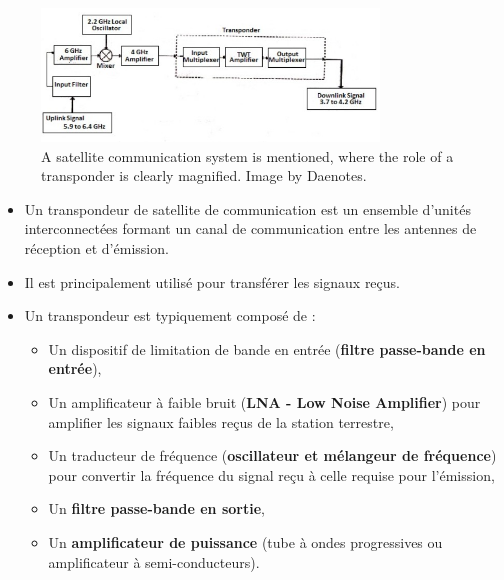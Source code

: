 \begin{figure}[H]
    \centering
    \includegraphics[width=0.8\textwidth]{figures/6-80.jpg}
    \caption{A satellite communication system is mentioned, where the role of a transponder is clearly magnified. Image by Daenotes.}
    \label{fig:communication7}
\end{figure}

\begin{itemize}
    \item Un transpondeur de satellite de communication est un ensemble d'unit\'es interconnect\'ees formant un canal de communication entre les antennes de r\'eception et d’\'emission.
    \item Il est principalement utilis\'e pour transf\'erer les signaux re\c{c}us.
    \item Un transpondeur est typiquement compos\'e de :
    \begin{itemize}
        \item Un dispositif de limitation de bande en entr\'ee (\textbf{filtre passe-bande en entr\'ee}),
        \item Un amplificateur \`a faible bruit (\textbf{LNA - Low Noise Amplifier}) pour amplifier les signaux faibles re\c{c}us de la station terrestre,
        \item Un traducteur de fr\'equence (\textbf{oscillateur et m\'elangeur de fr\'equence}) pour convertir la fr\'equence du signal re\c{c}u \`a celle requise pour l'\'emission,
        \item Un \textbf{filtre passe-bande en sortie},
        \item Un \textbf{amplificateur de puissance} (tube \`a ondes progressives ou amplificateur \`a semi-conducteurs).
    \end{itemize}
\end{itemize}
